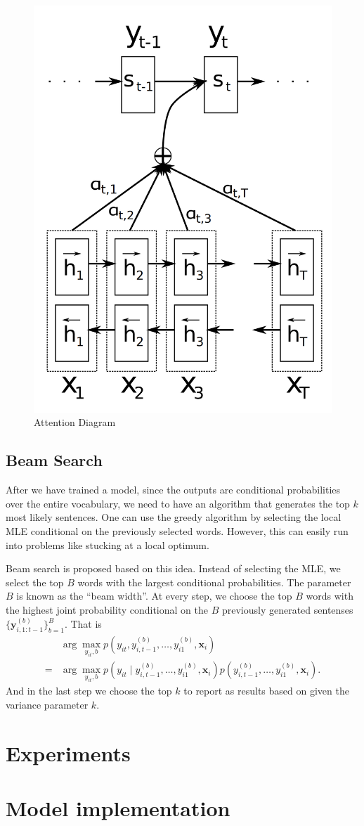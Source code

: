\documentclass[12pt]{article}
\begin{document}
\begin{figure}
	\centering
	\includegraphics[width=0.4\linewidth]{figs/attn_diagram}
	\caption{Attention Diagram}
	\label{attn_diagram}
\end{figure}


\subsection{Beam Search}
\label{sub:beam}
After we have trained a model, since the outputs are conditional probabilities over the entire vocabulary, we need to have an algorithm that generates the top $k$ most likely sentences. One can use the greedy algorithm by selecting the local MLE conditional on the previously selected words. However, this can easily run into problems like stucking at a local optimum.

Beam search is proposed based on this idea. Instead of selecting the MLE, we select the top $B$ words with the largest conditional probabilities. The parameter $B$ is known as the ``beam width''. At every step, we choose the top $B$ words with the highest joint probability conditional on the $B$ previously generated sentenses $\{\bm y_{i, 1:t-1}^{(b)}\}_{b=1}^B$. That is
\begin{align}
	&\arg \max_{y_{it}, b} p(y_{it}, y_{i,t-1}^{(b)}, \dots, y_{i1}^{(b)}, \bm x_i)\nonumber\\
	=& \arg \max_{y_{it}, b} p(y_{it} \mid y_{i,t-1}^{(b)}, \dots, y_{i1}^{(b)}, \bm x_i) p(y_{i,t-1}^{(b)}, \dots, y_{i1}^{(b)}, \bm x_i).
\end{align}
And in the last step we choose the top $k$ to report as results based on given the variance parameter $k$.

\section{Experiments}





\appendix
\section{Model implementation}
\end{document}
